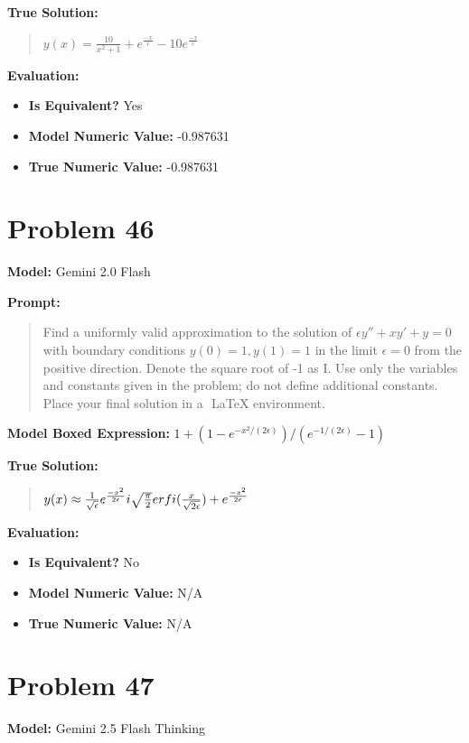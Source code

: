 \documentclass{article}
\begin{document}
\textbf{True Solution:}
\begin{quote}
$y(x) = \frac{10}{x^2+1} + e^{\frac{-x}{\epsilon}} - 10e^{\frac{-x}{\epsilon}}$
\end{quote}

\textbf{Evaluation:}
\begin{itemize}
\item \textbf{Is Equivalent?} Yes
\item \textbf{Model Numeric Value:} -0.987631
\item \textbf{True Numeric Value:} -0.987631
\end{itemize}
\vspace{1cm}
\section*{Problem 46}
\textbf{Model:} Gemini 2.0 Flash

\textbf{Prompt:}
\begin{quote}
Find a uniformly valid approximation to the solution of $\epsilon y'' + x y' + y = 0$ with boundary conditions $y(0)=1, y(1)=1$ in the limit $\epsilon = 0$ from the positive direction. Denote the square root of -1 as I. Use only the variables and constants given in the problem; do not define additional constants. Place your final solution in a $\boxed{}$ LaTeX environment.
\end{quote}
\textbf{Model Boxed Expression:} $1 + (1-e^{-x^2/(2\epsilon)})/(e^{-1/(2\epsilon)}-1)$

\textbf{True Solution:}
\begin{quote}
$y(x) \approx \frac{1}{\sqrt{\epsilon}}e^{\frac{-x^2}{2\epsilon}} \\i \sqrt{\frac{\pi}{2}}erfi(\frac{x}{\sqrt{2\epsilon}})+ e^{\frac{-x^2}{2\epsilon}}$
\end{quote}

\textbf{Evaluation:}
\begin{itemize}
\item \textbf{Is Equivalent?} No
\item \textbf{Model Numeric Value:} N/A
\item \textbf{True Numeric Value:} N/A
\end{itemize}
\vspace{1cm}
\section*{Problem 47}
\textbf{Model:} Gemini 2.5 Flash Thinking
\end{document}

